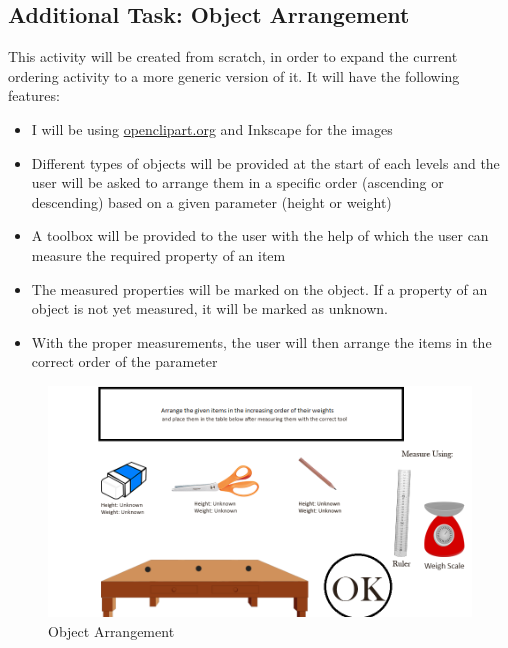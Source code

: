 \documentclass[preprint,12pt]{elsarticle}
\begin{document}
\subsection{ \textbf{Additional Task}: Object Arrangement}

This activity will be created from scratch, in order to expand the current ordering activity to a more generic version of it. It will have the following features:

\begin{itemize}

\item I will be using \href{https://openclipart.org/}{openclipart.org} and Inkscape for the images

\item Different types of objects will be provided at the start of each levels and the user will be asked to arrange them in a specific order (ascending or descending) based on a given parameter (height or weight)

\item A toolbox will be provided to the user with the help of which the user can measure the required property of an item

\item The measured properties will be marked on the object. If a property of an object is not yet measured, it will be marked as unknown.

\item With the proper measurements, the user will then arrange the items in the correct order of the parameter

\end{itemize}

\begin{figure}[H]
\centering\includegraphics[width=1.0\linewidth]{arrangement}
\caption{Object Arrangement}
\end{figure}
\end{document}
